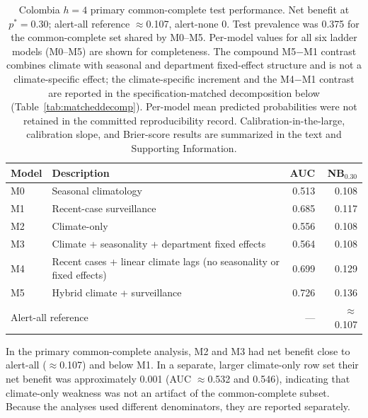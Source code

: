 \documentclass[11pt,a4paper]{article}
\begin{document}
\begin{table}[htbp]
\centering
\caption{Colombia $h=4$ primary common-complete test performance. Net benefit at $p^*=0.30$; alert-all reference $\approx$0.107, alert-none $0$. Test prevalence was 0.375 for the common-complete set shared by M0--M5. Per-model values for all six ladder models (M0--M5) are shown for completeness. The compound M5$-$M1 contrast combines climate with seasonal and department fixed-effect structure and is not a climate-specific effect; the climate-specific increment and the M4$-$M1 contrast are reported in the specification-matched decomposition below (Table~\ref{tab:matcheddecomp}). Per-model mean predicted probabilities were not retained in the committed reproducibility record. Calibration-in-the-large, calibration slope, and Brier-score results are summarized in the text and Supporting Information.}
\label{tab:colombia}
\small
\begin{tabular}{llrr}
\toprule
Model & Description & AUC & NB$_{0.30}$ \\
\midrule
M0 & Seasonal climatology & 0.513 & 0.108 \\
M1 & Recent-case surveillance & 0.685 & 0.117 \\
M2 & Climate-only & 0.556 & 0.108 \\
M3 & Climate + seasonality + department fixed effects & 0.564 & 0.108 \\
M4 & Recent cases + linear climate lags (no seasonality or fixed effects) & 0.699 & 0.129 \\
M5 & Hybrid climate + surveillance & 0.726 & 0.136 \\
\midrule
\multicolumn{2}{l}{Alert-all reference} & --- & $\approx$0.107 \\
\bottomrule
\end{tabular}
\end{table}

\noindent In the primary common-complete analysis, M2 and M3 had net benefit close to alert-all ($\approx$0.107) and below M1. In a separate, larger climate-only row set their net benefit was approximately 0.001 (AUC $\approx$0.532 and 0.546), indicating that climate-only weakness was not an artifact of the common-complete subset. Because the analyses used different denominators, they are reported separately.
\end{document}
